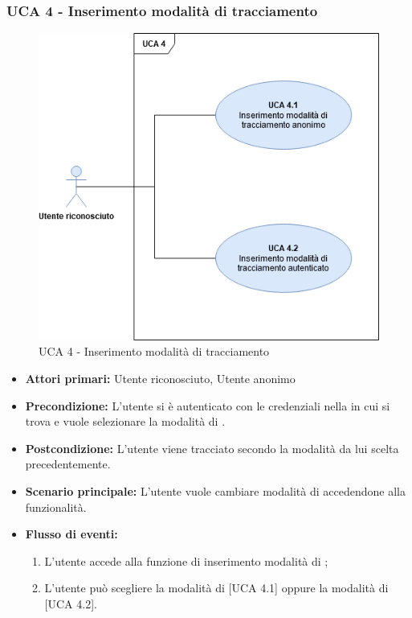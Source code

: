 \subsubsection{UCA 4 - Inserimento modalità di tracciamento}%

\begin{figure}[h]
	\centering	
	\includegraphics[scale=0.53, center]{Sezioni/UseCase/Immagini/UCA4.png}
	\caption{UCA 4 - Inserimento modalità di tracciamento}
\end{figure}

\begin{itemize}
	\item \textbf{Attori primari:} Utente riconosciuto, Utente anonimo
	\item \textbf{Precondizione:} L'utente si è autenticato con le credenziali  nella  in cui si trova e vuole selezionare la modalità di .
	\item \textbf{Postcondizione:} L'utente viene tracciato secondo la modalità da lui scelta precedentemente.
	\item \textbf{Scenario principale:} L'utente vuole cambiare modalità di  accedendone alla funzionalità.
	\item \textbf{Flusso di eventi:}
	\begin{enumerate}
		\item L'utente accede alla funzione di inserimento modalità di ;
		\item L'utente può scegliere la modalità di  [UCA 4.1] oppure la modalità di  [UCA 4.2].
	\end{enumerate}
\end{itemize}

